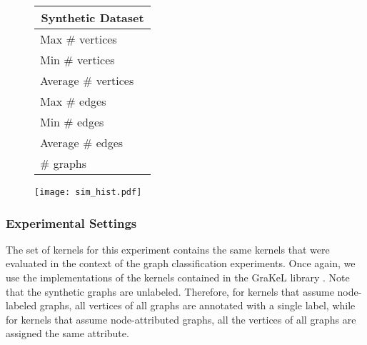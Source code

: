 \documentclass[twoside,11pt]{article}
\begin{document}
\begin{figure}[t]
    \begin{minipage}{0.4\linewidth}
        \centering
        \begin{tabular}{l|c} \hline
            \multicolumn{2}{c}{Synthetic Dataset} \\ \hline\hline
            Max \# vertices &  \\
            Min \# vertices &  \\
            Average \# vertices &  \\ \hline
            Max \# edges &  \\
            Min \# edges &  \\
            Average \# edges &  \\ \hline
            \# graphs &  \\ \hline
        \end{tabular}
        \label{tab:statistics_synthetic}
    \end{minipage}
    \hfill
    \begin{minipage}{0.5\linewidth}
        \centering
        \texttt{[image: sim\_hist.pdf]}
        \label{fig:sim_distribution}
    \end{minipage}
    \vspace{-.6cm}
\end{figure}

\subsubsection{Experimental Settings}
The set of kernels for this experiment contains the same  kernels that were evaluated in the context of the graph classification experiments.
Once again, we use the implementations of the kernels contained in the GraKeL library .
Note that the synthetic graphs are unlabeled.
Therefore, for kernels that assume node-labeled graphs, all vertices of all graphs are annotated with a single label, while for kernels that assume node-attributed graphs, all the vertices of all graphs are assigned the same attribute.
\end{document}

